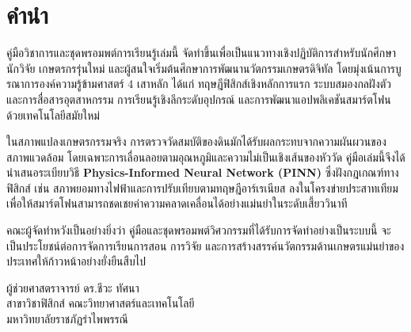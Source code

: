 \chapter*{คำนำ}

คู่มือวิชาการและชุดพรอมพต์การเรียนรู้เล่มนี้ จัดทำขึ้นเพื่อเป็นแนวทางเชิงปฏิบัติการสำหรับนักศึกษา นักวิจัย เกษตรกรรุ่นใหม่ และผู้สนใจเริ่มต้นศึกษาการพัฒนานวัตกรรมเกษตรดิจิทัล โดยมุ่งเน้นการบูรณาการองค์ความรู้ข้ามศาสตร์ 4 เสาหลัก ได้แก่ ทฤษฎีฟิสิกส์เชิงหลักการแรก ระบบสมองกลฝังตัวและการสื่อสารอุตสาหกรรม การเรียนรู้เชิงลึกระดับอุปกรณ์ และการพัฒนาแอปพลิเคชันสมาร์ตโฟนด้วยเทคโนโลยีสมัยใหม่

ในสภาพแปลงเกษตรกรรมจริง การตรวจวัดสมบัติของดินมักได้รับผลกระทบจากความผันผวนของสภาพแวดล้อม โดยเฉพาะการเลื่อนลอยตามอุณหภูมิและความไม่เป็นเชิงเส้นของหัววัด คู่มือเล่มนี้จึงได้นำเสนอระเบียบวิธี \textbf{Physics-Informed Neural Network (PINN)} ซึ่งฝังกฎเกณฑ์ทางฟิสิกส์ เช่น สภาพยอมทางไฟฟ้าและการปรับเทียบตามทฤษฎีอาร์เรเนียส ลงในโครงข่ายประสาทเทียม เพื่อให้สมาร์ตโฟนสามารถชดเชยค่าความคลาดเคลื่อนได้อย่างแม่นยำในระดับเสี้ยววินาที

คณะผู้จัดทำหวังเป็นอย่างยิ่งว่า คู่มือและชุดพรอมพต์วิศวกรรมที่ได้รับการจัดทำอย่างเป็นระบบนี้ จะเป็นประโยชน์ต่อการจัดการเรียนการสอน การวิจัย และการสร้างสรรค์นวัตกรรมด้านเกษตรแม่นยำของประเทศให้ก้าวหน้าอย่างยั่งยืนสืบไป

\vspace{1.5cm}
\begin{flushright}
    ผู้ช่วยศาสตราจารย์ ดร.ชีวะ ทัศนา\\
    สาขาวิชาฟิสิกส์ คณะวิทยาศาสตร์และเทคโนโลยี\\
    มหาวิทยาลัยราชภัฏรำไพพรรณี
\end{flushright}
